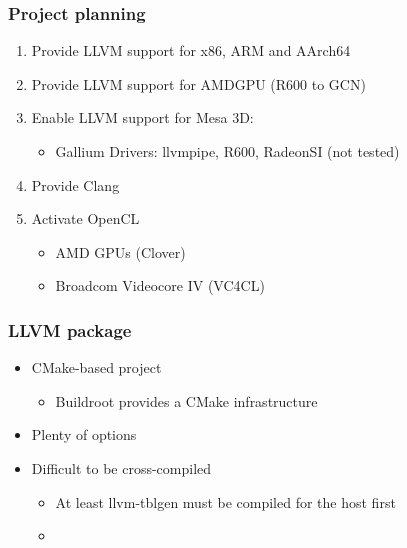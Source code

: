 \documentclass{beamer}
\begin{document}
\begin{frame}
\frametitle{Project planning}
\begin{enumerate}
  \item Provide LLVM support for x86, ARM and AArch64
  \item Provide LLVM support for AMDGPU (R600 to GCN)
  \item Enable LLVM support for Mesa 3D:
    \begin{itemize}
      \item Gallium Drivers: llvmpipe, R600, RadeonSI (not tested)
    \end{itemize}
  \item Provide Clang
  \item Activate OpenCL
  \begin{itemize}
    \item AMD GPUs (Clover)
    \item Broadcom Videocore IV (VC4CL)
  \end{itemize}
\end{enumerate}
\end{frame}

\begin{frame}
\frametitle{LLVM package}
\begin{itemize}
  \item CMake-based project
  \begin{itemize}
    \item Buildroot provides a CMake infrastructure \smiley
  \end{itemize}
  \item Plenty of options
  \item Difficult to be cross-compiled
  \begin{itemize}
    \item At least llvm-tblgen must be compiled for the host first
    \item
  \end{itemize}
\end{itemize}
\end{frame}
\end{document}
